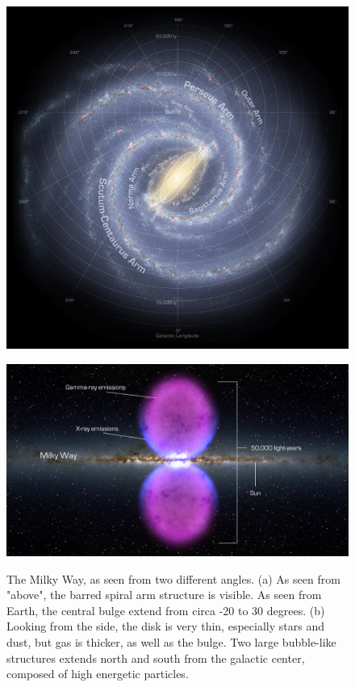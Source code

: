 \begin{figure}[h]
  \centering
  \begin{minipage}[h]{0.45\textwidth}
  	\centering
	\includegraphics[width=1.\linewidth]{pic/theory/top_galaxy_map.jpg}
  	\label{fig:top_gal_map}
  \end{minipage}
  \hfill
  \begin{minipage}[h]{0.45\textwidth}
	  \centering
	  \includegraphics[width=1.\linewidth]{pic/theory/Fermi_bubble.jpg}
	  \label{fig:fermi_bubbles}
  \end{minipage}
  \caption{The Milky Way, as seen from two different angles. (a) As seen from "above", the barred spiral arm structure is visible. As seen from Earth, the central bulge extend from circa -20 to 30 degrees. (b) Looking from the side, the disk is very thin, especially stars and dust, but gas is thicker, as well as the bulge. Two large bubble-like structures extends north and south from the galactic center, composed of high energetic particles.}
  \label{fig:Galaxy_maps} 
\end{figure}


